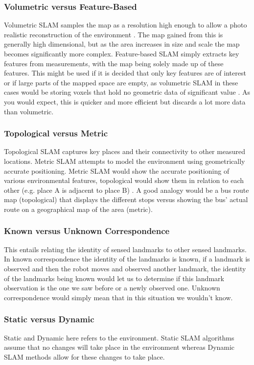 					\subsubsection{Volumetric versus Feature-Based}
					Volumetric SLAM samples the map as a resolution high enough to allow a photo realistic reconstruction of the environment \citep{thrun2008simultaneous}. The map gained from this is generally high dimensional, but as the area increases in size and scale the map becomes significantly more complex. Feature-based SLAM simply extracts key features from measurements, with the map being solely made up of these features. This might be used if it is decided that only key features are of interest or if large parts of the mapped space are empty, as volumetric SLAM in these cases would be storing voxels that hold no geometric data of significant value \citep{vespa2018efficient}. As you would expect, this is quicker and more efficient but discards a lot more data than volumetric. 
					
					\subsubsection{Topological versus Metric}
					Topological SLAM captures key places and their connectivity to other measured locations. Metric SLAM attempts to model the environment using geometrically accurate positioning. Metric SLAM would show the accurate positioning of various environmental features, topological would show them in relation to each other (e.g. place A is adjacent to place B) \citep{thrun2008simultaneous}. A good analogy would be a bus route map (topological) that displays the different stops versus showing the bus' actual route on a geographical map of the area (metric).
					
					\subsubsection{Known versus Unknown Correspondence}
					This entails relating the identity of sensed landmarks to other sensed landmarks. In known correspondence the identity of the landmarks is known, if a landmark is observed and then the robot moves and observed another landmark, the identity of the landmarks being known would let us to determine if this landmark observation is the one we saw before or a newly observed one. Unknown correspondence would simply mean that in this situation we wouldn't know.	
					
					\subsubsection{Static versus Dynamic}
					Static and Dynamic here refers to the environment. Static SLAM algorithms assume that no changes will take place in the environment whereas Dynamic SLAM methods allow for these changes to take place.
					
